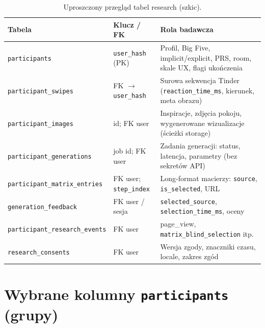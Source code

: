 \begin{table}[htbp]
  \centering
  \small
  \caption{Uproszczony przegląd tabel research (szkic).}
  \label{tab:app:a:tables}
  \begin{tabular}{@{}llp{6.5cm}@{}}
    \toprule
    Tabela & Klucz / FK & Rola badawcza \\
    \midrule
    \texttt{participants} &
      \texttt{user\_hash} (PK) &
      Profil, Big Five, implicit/explicit, PRS, room, skale UX, flagi ukończenia \\
    \texttt{participant\_swipes} &
      FK $\rightarrow$ \texttt{user\_hash} &
      Surowa sekwencja Tinder (\texttt{reaction\_time\_ms}, kierunek, meta obrazu) \\
    \texttt{participant\_images} &
      id; FK user &
      Inspiracje, zdjęcia pokoju, wygenerowane wizualizacje (ścieżki storage) \\
    \texttt{participant\_generations} &
      job id; FK user &
      Zadania generacji: status, latencja, parametry (bez sekretów API) \\
    \texttt{participant\_matrix\_entries} &
      FK user; \texttt{step\_index} &
      Long-format macierzy: \texttt{source}, \texttt{is\_selected}, URL \\
    \texttt{generation\_feedback} &
      FK user / sesja &
      \texttt{selected\_source}, \texttt{selection\_time\_ms}, oceny \\
    \texttt{participant\_research\_events} &
      FK user &
      page\_view, \texttt{matrix\_blind\_selection} itp. \\
    \texttt{research\_consents} &
      FK user &
      Wersja zgody, znaczniki czasu, locale, zakres zgód \\
    \bottomrule
  \end{tabular}
\end{table}

\section{Wybrane kolumny \texttt{participants} (grupy)}
\label{app:a:sec:participants}

